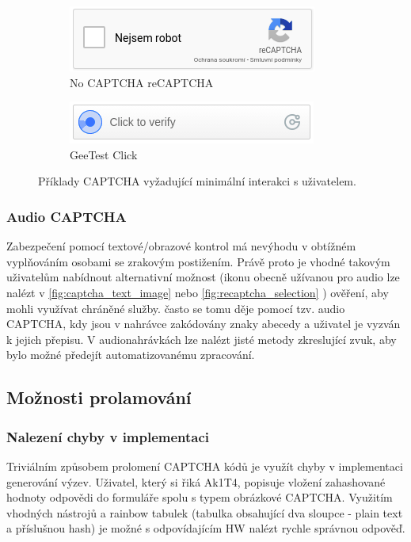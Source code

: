 \documentclass[
  field=ainfp,
  master=true,
  biblatex,
  sourcecodes=false,
  theorems=false,
  glossaries,
  index
]{kidiplom}
\begin{document}
\begin{figure}[H]
\centering
\begin{subfigure}{.5\textwidth}
  \centering
  \includegraphics[width=.8\linewidth]{images/nocaptcha.png}
  \caption{No CAPTCHA reCAPTCHA}
  \label{fig:sub1}
\end{subfigure}%
\begin{subfigure}{.5\textwidth}
  \centering
  \includegraphics[width=.8\linewidth]{images/geetest_click.png}
  \caption{GeeTest Click}
  \label{fig:sub2}
\end{subfigure}
\caption{Příklady CAPTCHA vyžadující minimální interakci s uživatelem.}
\label{fig:test}
\end{figure}

\subsubsection*{Audio CAPTCHA}
Zabezpečení pomocí textové/obrazové kontrol má nevýhodu v obtížném vyplňováním osobami se zrakovým postižením. Právě proto je vhodné takovým uživatelům nabídnout alternativní možnost (ikonu obecně užívanou pro audio lze nalézt v \ref{fig:captcha_text_image} nebo \ref{fig:recaptcha_selection} ) ověření, aby mohli využívat chráněné služby. často se tomu děje pomocí tzv. audio CAPTCHA, kdy jsou v nahrávce zakódovány znaky abecedy a uživatel je vyzván k jejich přepisu. V audionahrávkách lze nalézt jisté metody zkreslující zvuk, aby bylo možné předejít automatizovanému zpracování.

\subsection{Možnosti prolamování}
\subsubsection*{Nalezení chyby v implementaci}
Triviálním způsobem prolomení CAPTCHA kódů je využít chyby v implementaci generování výzev. Uživatel, který si řiká Ak1T4, popisuje \cite{web:akita} vložení zahashované hodnoty odpovědi do formuláře spolu s typem obrázkové CAPTCHA. Využitím vhodných nástrojů a rainbow tabulek (tabulka obsahující dva sloupce - plain text a příslušnou hash) je možné s odpovídajícím HW nalézt rychle správnou odpověď.
\end{document}
